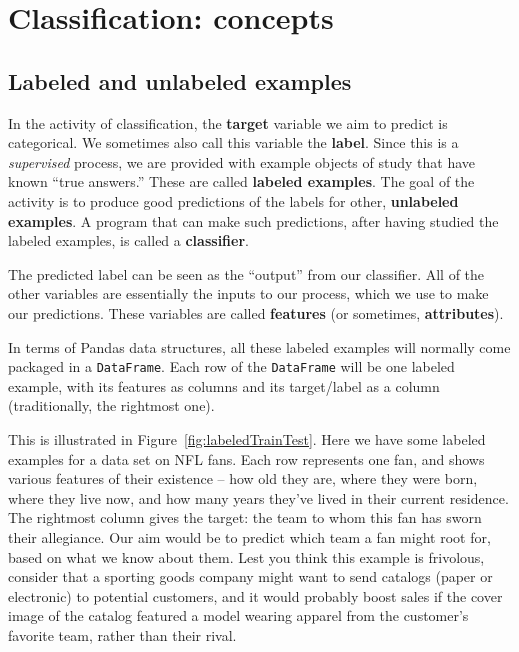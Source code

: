 
\chapter{Classification: concepts}

\section{Labeled and unlabeled examples}


In the activity of classification, the \textbf{target} variable we aim to
predict is categorical. We sometimes also call this variable the
\textbf{label}. Since this is a \textit{supervised} process, we are provided
with example objects of study that have known ``true answers.'' These are
called \textbf{labeled examples}. The goal of the activity is to produce good
predictions of the labels for other, \textbf{unlabeled examples}. A program
that can make such predictions, after having studied the labeled examples, is
called a \textbf{classifier}.


The predicted label can be seen as the ``output'' from our classifier. All of
the other variables are essentially the inputs to our process, which we use to
make our predictions. These variables are called \textbf{features} (or
sometimes, \textbf{attributes}).

In terms of Pandas data structures, all these labeled examples will normally
come packaged in a \texttt{DataFrame}. Each row of the \texttt{DataFrame} will
be one labeled example, with its features as columns and its target/label as a
column (traditionally, the rightmost one).

This is illustrated in Figure~\ref{fig:labeledTrainTest}. Here we have some
labeled examples for a data set on NFL fans. Each row represents one fan, and
shows various features of their existence -- how old they are, where they were
born, where they live now, and how many years they've lived in their current
residence. The rightmost column gives the target: the team to whom this fan has
sworn their allegiance. Our aim would be to predict which team a fan might root
for, based on what we know about them. Lest you think this example is
frivolous, consider that a sporting goods company might want to send catalogs
(paper or electronic) to potential customers, and it would probably boost sales
if the cover image of the catalog featured a model wearing apparel from
the customer's favorite team, rather than their rival.

